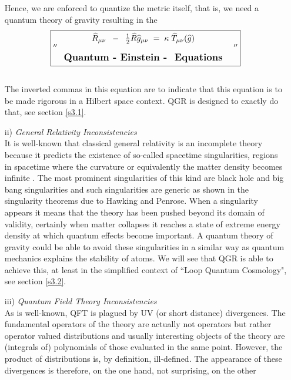 \documentclass[12pt]{report}
\def\be{\begin{equation}}
\def\ee{\end{equation}}
\def\blue{\relax}
\def\red{\relax}
\def\green{\relax}
\begin{document}
\begin{itemize}
Hence, we are enforced to quantize the metric itself, that is, we need
a quantum theory of gravity resulting in the
%
\boldmath
%
\be \nonumber
\fbox{$^{\prime\prime}
\left. \begin{array}{c}
{\large {\blue \widehat{R}_{\mu\nu} \;\; -\;\; 
\frac{1}{2}\widehat{R}\widehat{g}_{\mu\nu}} \;\;
{\red =} \;\;
{\green \kappa\; \widehat{T}_{\mu\nu}(}{\blue \widehat{g}}{\green )}} \\
\\
\mbox{{\bf\large {\green Quantum}  {\blue - Einstein - }  {\red 
Equations}}}
\end{array} \right. \;\;^{\prime\prime}
$}
\ee
\unboldmath
~~~~~~~\\
The inverted commas in this equation are to indicate that this 
equation is to be made rigorous in a Hilbert space context. QGR is
designed to exactly do that, see section \ref{s3.1}. 
%
\item[ii)] {\it General Relativity Inconsistencies}\\
It is well-known that classical general relativity is an incomplete theory
because it predicts the existence of so-called spacetime singularities, 
regions 
in spacetime where the curvature or equivalently the matter density 
becomes
infinite \cite{2}. The most prominent singularities of this kind are 
black hole and big bang singularities and such singularities are generic
as shown in the singularity theorems due to Hawking and Penrose. When
a singularity appears it means that the theory has been pushed beyond its 
domain of 
validity, certainly when matter collapses it reaches a state of extreme 
energy density at which quantum effects become important. A quantum theory
of gravity could be able to avoid these singularities in a similar way
as quantum mechanics explains the stability of atoms. We will see that
QGR is able to achieve this, at least in the simplified context of 
``Loop Quantum Cosmology", see section \ref{s3.2}.
%
\item[iii)] {\it Quantum Field Theory Inconsistencies}\\
As is well-known, QFT is plagued by UV (or short distance) divergences. 
The fundamental 
operators of the theory are actually not operators but rather operator
valued distributions and usually interesting objects of the theory
are (integrals of) polynomials of those evaluated in the same point. 
However, the product of distributions is, by definition, ill-defined.
The 
appearance of these 
divergences is therefore, on the one hand, not surprising, on the other 

\end{itemize}
\end{document}
